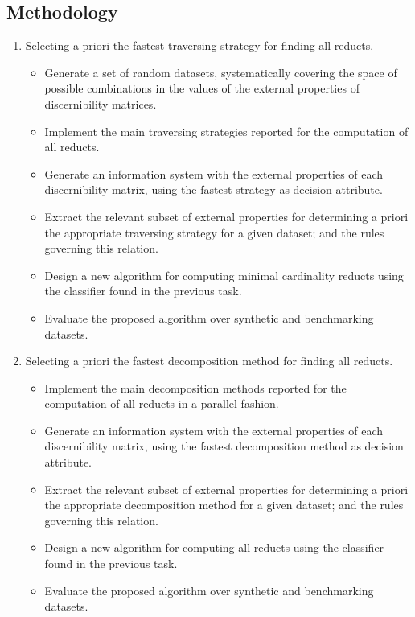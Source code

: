 \documentclass[authoryear,11pt]{elsarticle}
\begin{document}
\subsection{Methodology}\label{Methodology} 
\begin{enumerate}
	\item Selecting a priori the fastest traversing strategy for finding all reducts.
	\begin{itemize}
  		\item Generate a set of random datasets, systematically covering the space of possible combinations in 
  			  the values of the external properties of discernibility matrices.
  		\item Implement the main traversing strategies reported for the computation of all reducts.
  		\item Generate an information system with the external properties of each discernibility matrix, using 
  			  the fastest strategy as decision attribute.
  		\item Extract the relevant subset of external properties for determining a priori the appropriate 
  			  traversing strategy for a given dataset; and the rules governing this relation.
  		\item Design a new algorithm for computing minimal cardinality reducts using the classifier found in
  			  the previous task.
  		\item Evaluate the proposed algorithm over synthetic and benchmarking datasets.
  	\end{itemize}
  	\item Selecting a priori the fastest decomposition method for finding all reducts.
	\begin{itemize}
  		\item Implement the main decomposition methods reported for the computation of all reducts
  			  in a parallel fashion.
  		\item Generate an information system with the external properties of each discernibility matrix, using 
  			  the fastest decomposition method as decision attribute.
  		\item Extract the relevant subset of external properties for determining a priori the appropriate 
  			  decomposition method for a given dataset; and the rules governing this relation.
  		\item Design a new algorithm for computing all reducts using the classifier found in the previous task.
  		\item Evaluate the proposed algorithm over synthetic and benchmarking datasets.

\end{itemize}
\end{enumerate}
\end{document}
